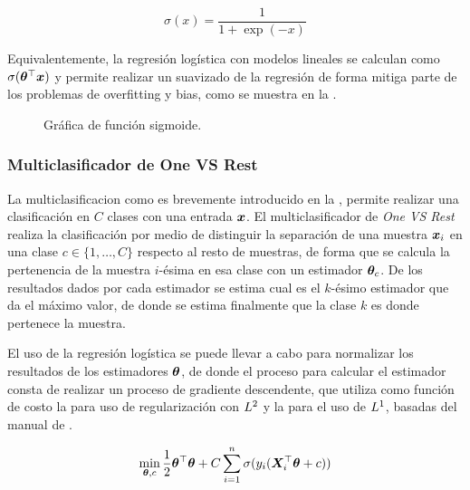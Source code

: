 \begin{equation} \label{eq:logits-formula}
  \sigma(x) = \frac{1} {1 + \exp(-x)}
\end{equation}

Equivalentemente, la regresión logística con modelos lineales se calculan como $\sigma({\bm{\theta}}^{\top} {\bm{x}})$ y permite realizar un suavizado de la regresión de forma mitiga parte de los problemas de \gls{overfitting} y \gls{bias}, como se muestra en la .

\begin{figure}[H]
  \centering
\decoRule
\caption[Gráfica de función sigmoide]{Gráfica de función sigmoide.}
\label{fig:logits-example}
\end{figure}

\subsubsection{Multiclasificador de One VS Rest}
La multiclasificacion como es brevemente introducido en la , permite realizar una clasificación en $C$ clases con una entrada ${\bm{x}}$. El multiclasificador de \emph{One VS Rest} realiza la clasificación por medio de distinguir la separación de una muestra ${\bm{x}}_i$ en una clase $c \in \{1, \ldots, C\}$ respecto al resto de muestras, de forma que se calcula la pertenencia de la muestra $i$-\'esima en esa clase con un estimador ${\bm{\theta}}_c$. De los resultados dados por cada estimador se estima cual es el $k$-\'esimo estimador que da el máximo valor, de donde se estima finalmente que la clase $k$ es donde pertenece la muestra.

El uso de la regresión logística se puede llevar a cabo para normalizar los resultados de los estimadores ${\bm{\theta}}$, de donde el proceso para calcular el estimador consta de realizar un proceso de gradiente descendente, que utiliza como función de costo la  para uso de regularización con $L^2$ y la  para el uso de $L^1$, basadas del manual de \cite{sklearn_api}.

\begin{equation} \label{eq:ovr-reg-l2costfunc}
  \min_{{\bm{\theta}}, c} \frac{1}{2}{\bm{\theta}}^{\top} {\bm{\theta}} + C \sum_{i=1}^n \sigma(y_i ({\bm{X}}_i^{\top} {\bm{\theta}} + c))
\end{equation}

